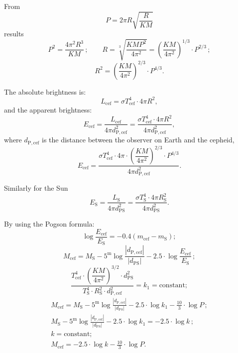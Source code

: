 From
\[ P = 2\pi R\sqrt{\frac{R}{KM}} \]
results
\[ P^2 = \frac{4\pi^2 R^3}{KM}\,;\qquad
   R = \sqrt[3]{\frac{KMP^2}{4\pi^2}}
     = \left(\frac{KM}{4\pi^2}\right)^{1/3}\cdot P^{2/3}\,;
\]
\[ R^2 = \left(\frac{KM}{4\pi^2}\right)^{2/3}\cdot P^{4/3}. \]

The absolute brightness is:
\[ L_{\mathrm{cef}} = \sigma T_{\mathrm{cef}}^4 \cdot 4\pi R^2, \]
and the apparent brightness:
\[ E_{\mathrm{cef}} = \frac{L_{\mathrm{cef}}}{4\pi d_{\mathrm{P,cef}}^2}
   = \frac{\sigma T_{\mathrm{cef}}^4 \cdot 4\pi R^2}
          {4\pi d_{\mathrm{P,cef}}^2}, \]
where $d_{\mathrm{P,cef}}$ is the distance between the observer on Earth and
the cepheid,
\[ E_{\mathrm{cef}} = \frac{\sigma T_{\mathrm{cef}}^4\cdot 4\pi\cdot
   \left(\dfrac{KM}{4\pi^2}\right)^{2/3}\cdot P^{4/3}}
   {4\pi d_{\mathrm{P,cef}}^2}. \]

Similarly for the Sun
\[ E_{\mathrm{S}} = \frac{L_{\mathrm{S}}}{4\pi d_{\mathrm{PS}}^2}
   = \frac{\sigma T_{\mathrm{S}}^4 \cdot 4\pi R_{\mathrm{S}}^2}
          {4\pi d_{\mathrm{PS}}^2}. \]

By using the Pogson formula:
\[ \log\frac{E_{\mathrm{cef}}}{E_{\mathrm{S}}}
   = -0.4\left(m_{\mathrm{cef}} - m_{\mathrm{S}}\right); \]
\[ M_{\mathrm{cef}} = M_{\mathrm{S}}
   - 5^{\mathrm{m}}\log\frac{\left|d_{\mathrm{P,cef}}\right|}
                            {\left|d_{\mathrm{PS}}\right|}
   - 2.5\cdot\log\frac{E_{\mathrm{cef}}}{E_{\mathrm{S}}}\,; \]
\[ \frac{T_{\mathrm{cef}}^4\cdot\left(\dfrac{KM}{4\pi^2}\right)^{3/2}
   \cdot d_{\mathrm{PS}}^2}
   {T_{\mathrm{S}}^4\cdot R_{\mathrm{S}}^2\cdot d_{\mathrm{P,cef}}^2}
   = k_1 = \text{constant}; \]
\begin{gather*}
M_{\mathrm{cef}} = M_{\mathrm{S}}
  - 5^{\mathrm{m}}\log\frac{\left|d_{\mathrm{P,cef}}\right|}
                           {\left|d_{\mathrm{PS}}\right|}
  - 2.5\cdot\log k_1 - \frac{10}{3}\cdot\log P\,; \\
M_{\mathrm{S}}
  - 5^{\mathrm{m}}\log\frac{\left|d_{\mathrm{P,cef}}\right|}
                           {\left|d_{\mathrm{PS}}\right|}
  - 2.5\cdot\log k_1 = -2.5\cdot\log k\,; \\
k = \text{constant}; \\
M_{\mathrm{cef}} = -2.5\cdot\log k - \frac{10}{3}\cdot\log P.
\end{gather*}
